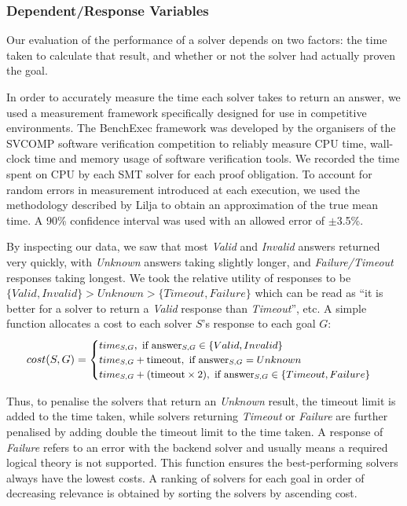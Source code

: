 \documentclass[submission,copyright,creativecommons]{eptcs}
\begin{document}
\subsubsection{Dependent/Response Variables}
\label{sec:dependant}

Our evaluation of the performance of a solver depends on two factors: the time taken to calculate that result, and whether or not the solver had actually proven the goal.

In order to accurately measure the time each solver takes to return an answer, we used a measurement framework specifically designed for use in competitive environments. The BenchExec \cite{benchexec} framework was developed by the organisers of the SVCOMP \cite{SVCOMP} software verification competition to reliably measure CPU time, wall-clock time and memory usage of software verification tools. We recorded the time spent on CPU by each SMT solver for each proof obligation. To account for random errors in measurement introduced at each execution, we used the methodology described by Lilja \cite{LiljaJ} to obtain an approximation of the true mean time. A 90\% confidence interval was used with an allowed error of $\pm$3.5\%.   

By inspecting our data, we saw that most \textit{Valid} and \textit{Invalid} answers returned very quickly, with \textit{Unknown} answers taking slightly longer, and \textit{Failure/Timeout} responses taking longest. We took the relative utility of responses to be $\lbrace Valid, Invalid\rbrace>Unknown>\lbrace Timeout,Failure\rbrace$ which can be read as ``it is better for a solver to return a \textit{Valid} response than \textit{Timeout}'', etc. A simple function allocates a cost to each solver $S$'s response to each goal $G$:
\[\small
	cost(S,G) = 
	\begin{cases}
		time_{S,G}, \text{ if answer}_{S,G} \in \lbrace Valid, Invalid \rbrace \\
		time_{S,G} + \text{timeout}, \text{ if answer}_{S,G} = Unknown \\
		time_{S,G} + (\text{timeout} \times 2), \text{ if answer}_{S,G} \in \lbrace Timeout, Failure \rbrace
	\end{cases}
\]

Thus, to penalise the solvers that return an \textit{Unknown} result, the timeout limit is added to the time taken, while solvers returning \textit{Timeout} or \textit{Failure} are further penalised by 
adding double the timeout limit to the time taken.
A response of \textit{Failure} refers to an error with the backend solver and usually means a required logical theory is not supported. 
This function ensures the best-performing solvers always have the lowest costs. A ranking of solvers for each goal in order of decreasing relevance is obtained by sorting the solvers by ascending cost.
\end{document}
